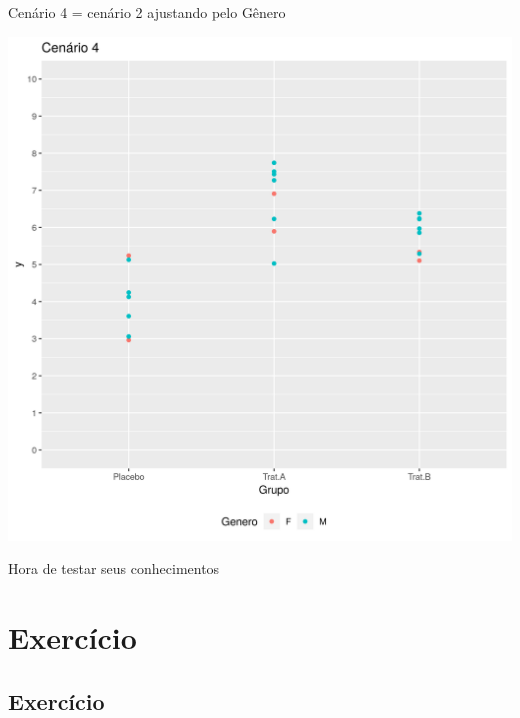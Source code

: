 \documentclass{beamer}
\begin{document}

\begin{frame}[label=cenario4]{\scriptsize Cenário 4 = cenário 2 ajustando pelo Gênero}
  \begin{center}
    \includegraphics[height=.9\textheight]{Cap13-30/cenario22}
  \end{center}
\end{frame}

\begin{frame}{\scriptsize }
  \begin{center}
    Hora de testar seus conhecimentos
  \end{center}
\end{frame}

\section{Exercício}

\subsection{Exercício}



\end{document}
